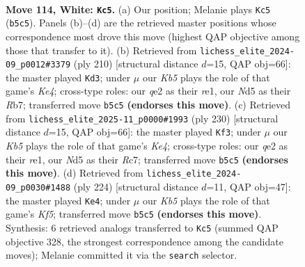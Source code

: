 \documentclass[11pt]{article}
\begin{document}
\clearpage

\begin{figure}[p]\centering
\begin{subfigure}{0.46\textwidth}\centering
\resizebox{\linewidth}{!}{%
\newchessgame
\chessboard[
  setfen={3B4/1k6/8/1K1N1R2/8/8/4q3/8 w - - 4 114},
  showmover=false,
  pgfstyle=straightmove, color=movearrow, markmove={b5-c5}
]}
\caption{}
\end{subfigure}\hfill
\begin{subfigure}{0.46\textwidth}\centering
\resizebox{\linewidth}{!}{%
\newchessgame
\chessboard[
  setfen={5k2/1R5P/8/8/4K3/8/8/4r3 w - - 41 106},
  showmover=false,
  pgfstyle=straightmove, color=movearrow, markmove={e4-d3}
]}
\caption{}
\end{subfigure}
\\[4pt]
\begin{subfigure}{0.46\textwidth}\centering
\resizebox{\linewidth}{!}{%
\newchessgame
\chessboard[
  setfen={5k2/2R4P/8/8/4K3/8/8/4r3 w - - 95 116},
  showmover=false,
  pgfstyle=straightmove, color=movearrow, markmove={e4-f3}
]}
\caption{}
\end{subfigure}\hfill
\begin{subfigure}{0.46\textwidth}\centering
\resizebox{\linewidth}{!}{%
\newchessgame
\chessboard[
  setfen={8/5q2/3k4/5K2/5N2/8/8/8 w - - 2 113},
  showmover=false,
  pgfstyle=straightmove, color=movearrow, markmove={f5-e4}
]}
\caption{}
\end{subfigure}
\caption{\textbf{Move 114, White: \texttt{Kc5}.} (a) Our position; Melanie plays \texttt{Kc5} (\texttt{b5c5}). Panels (b)--(d) are the retrieved master positions whose correspondence most drove this move (highest QAP objective among those that transfer to it). (b) Retrieved from \texttt{lichess\_elite\_2024-09\_p0012\#3379} (ply 210) [structural distance $d$=15, QAP obj=66]: the master played \texttt{Kd3}; under $\mu$ our \emph{Kb5} plays the role of that game's \emph{Ke4}; cross-type roles: our \emph{q}e2 as their \emph{r}e1, our \emph{N}d5 as their \emph{R}b7; transferred move \texttt{b5c5} \textbf{(endorses this move)}. (c) Retrieved from \texttt{lichess\_elite\_2025-11\_p0000\#1993} (ply 230) [structural distance $d$=15, QAP obj=66]: the master played \texttt{Kf3}; under $\mu$ our \emph{Kb5} plays the role of that game's \emph{Ke4}; cross-type roles: our \emph{q}e2 as their \emph{r}e1, our \emph{N}d5 as their \emph{R}c7; transferred move \texttt{b5c5} \textbf{(endorses this move)}. (d) Retrieved from \texttt{lichess\_elite\_2024-09\_p0030\#1488} (ply 224) [structural distance $d$=11, QAP obj=47]: the master played \texttt{Ke4}; under $\mu$ our \emph{Kb5} plays the role of that game's \emph{Kf5}; transferred move \texttt{b5c5} \textbf{(endorses this move)}. Synthesis: 6 retrieved analogs transferred to \texttt{Kc5} (summed QAP objective 328, the strongest correspondence among the candidate moves); Melanie committed it via the \texttt{search} selector.}
\label{fig:thought-m226}
\end{figure}
\end{document}
